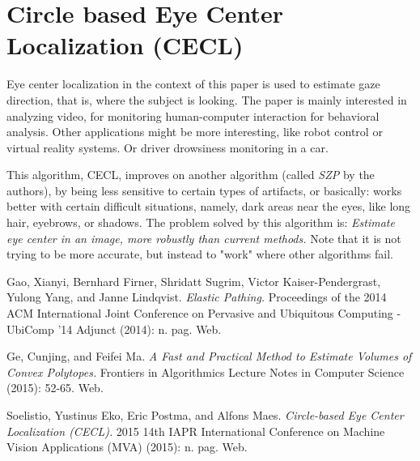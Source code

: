 \documentclass[11pt]{article}
\begin{document}
\section{Circle based Eye Center Localization (CECL)\cite{Soelistio}}
Eye center localization in the context of this paper is used to estimate gaze direction, that is, where the subject is looking. The paper is mainly interested in analyzing video, for monitoring human-computer interaction for behavioral analysis. Other applications might be more interesting, like robot control or virtual reality systems. Or driver drowsiness monitoring in a car.

This algorithm, CECL, improves on another algorithm (called {\em SZP} by the authors), by being less sensitive to certain types of artifacts, or basically:  works better with certain difficult situations, namely, dark areas near the eyes, like long hair, eyebrows, or shadows.
The problem solved by this algorithm is:  {\em Estimate eye center in an image, more robustly than current methods.}  Note that it is not trying to be more accurate, but instead to "work" where other algorithms fail.

\begin{thebibliography}{10}
  Gao, Xianyi, Bernhard Firner, Shridatt Sugrim, Victor Kaiser-Pendergrast, Yulong Yang, and Janne Lindqvist. {\em Elastic Pathing.} Proceedings of the 2014 ACM International Joint Conference on Pervasive and Ubiquitous Computing - UbiComp '14 Adjunct (2014): n. pag. Web.


 Ge, Cunjing, and Feifei Ma. {\em A Fast and Practical Method to Estimate Volumes of Convex Polytopes.} Frontiers in Algorithmics Lecture Notes in Computer Science (2015): 52-65. Web.


 Soelistio, Yustinus Eko, Eric Postma, and Alfons Maes. {\em Circle-based Eye Center Localization (CECL).} 2015 14th IAPR International Conference on Machine Vision Applications (MVA) (2015): n. pag. Web.
\end{thebibliography}
\end{document}
